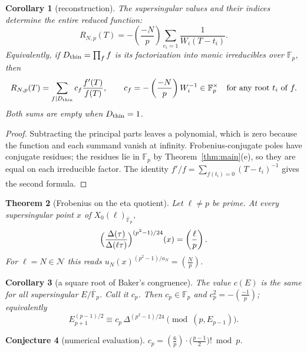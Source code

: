 \documentclass[11pt,a4paper]{article}
\numberwithin{equation}{section}
\newtheorem{theorem}{Theorem}[section]
\newtheorem{corollary}[theorem]{Corollary}
\newtheorem{conjecture}[theorem]{Conjecture}
\theoremstyle{definition}
\theoremstyle{remark}
\newcommand{\Fp}{\mathbb F_p}
\newcommand{\Fb}{\overline{\mathbb F}_p}
\newcommand{\leg}[2]{\left(\frac{#1}{#2}\right)}
\newcommand{\Lp}[1]{\left(\frac{#1}{p}\right)}
\begin{document}
\begin{corollary}[reconstruction]\label{cor:reconstruction}
The supersingular values and their indices determine the entire reduced function:
\begin{equation}\label{eq:partial-fractions}
R_{N,p}(T)=-\Lp{-N}\sum_{e_i=1}\frac{1}{W_i(T-t_i)}.
\end{equation}
Equivalently, if $D_{\rm thin}=\prod_f f$ is its factorization into monic
irreducibles over $\Fp$, then
\begin{equation}\label{eq:factor-reconstruction}
R_{N,p}(T)=\sum_{f\mid D_{\rm thin}} c_f\frac{f'(T)}{f(T)},\qquad
c_f=-\Lp{-N}W_i^{-1}\in\Fp^\times\quad\text{for any root }t_i\text{ of }f.
\end{equation}
Both sums are empty when $D_{\rm thin}=1$.
\end{corollary}
\begin{proof}
Subtracting the principal parts leaves a polynomial, which is zero because the
function and each summand vanish at infinity. Frobenius-conjugate poles have
conjugate residues; the residues lie in $\Fp$ by Theorem~\ref{thm:main}(e), so
they are equal on each irreducible factor. The identity
$f'/f=\sum_{f(t_i)=0}(T-t_i)^{-1}$ gives the second formula.
\end{proof}

\begin{theorem}[Frobenius on the eta quotient]\label{thm:C}
Let $\ell\ne p$ be prime. At every supersingular point $x$ of $X_0(\ell)_{\Fb}$,
\[
\Bigl(\frac{\Delta(\tau)}{\Delta(\ell\tau)}\Bigr)^{(p^2-1)/24}(x)=\leg{\ell}{p}.
\]
For $\ell=N\in\mathcal N$ this reads $u_N(x)^{(p^2-1)/a_N}=\Lp{N}$.
\end{theorem}

\begin{corollary}[a square root of Baker's congruence]\label{cor:D}
The value $c(E)$ is the same for all supersingular $E/\Fb$. Call it $c_p$. Then
$c_p\in\Fp$ and $c_p^2=-\Lp{-1}$; equivalently
\[
E_{p+1}^{(p-1)/2}\equiv c_p\,\Delta^{(p^2-1)/24}\pmod{(p,E_{p-1})}.
\]
\end{corollary}

\begin{conjecture}[numerical evaluation]\label{conj:E}
$c_p=\leg{6}{p}\cdot\bigl(\tfrac{p-1}{2}\bigr)!\bmod p$.
\end{conjecture}
\end{document}

